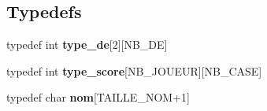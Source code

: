 \subsection*{Typedefs}
\begin{DoxyCompactItemize}
\item 
\mbox{\label{yams___cleo___martin-_colleu__2_80_8c_aa30d701a6cf40e0513a3b9522e2ad855}} 
typedef int {\bfseries type\+\_\+de}\mbox{[}2\mbox{]}\mbox{[}N\+B\+\_\+\+DE\mbox{]}
\item 
\mbox{\label{yams___cleo___martin-_colleu__2_80_8c_aa0d650ad4889c607a2ad887872ff57b4}} 
typedef int {\bfseries type\+\_\+score}\mbox{[}N\+B\+\_\+\+J\+O\+U\+E\+UR\mbox{]}\mbox{[}N\+B\+\_\+\+C\+A\+SE\mbox{]}
\item 
\mbox{\label{yams___cleo___martin-_colleu__2_80_8c_a6f9df657e03fde4bd39a4d4f7901cd06}} 
typedef char {\bfseries nom}\mbox{[}T\+A\+I\+L\+L\+E\+\_\+\+N\+OM+1\mbox{]}
\end{DoxyCompactItemize}
